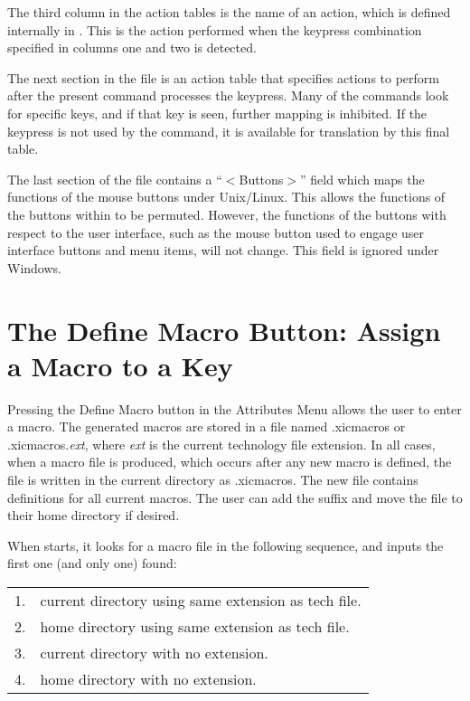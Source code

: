 The third column in the action tables is the name of an action, which
is defined internally in {\Xic}.  This is the action performed when
the keypress combination specified in columns one and two is detected.

The next section in the file is an action table that specifies actions
to perform after the present {\Xic} command processes the keypress. 
Many of the {\Xic} commands look for specific keys, and if that key is
seen, further mapping is inhibited.  If the keypress is not used by
the command, it is available for translation by this final table.

The last section of the file contains a ``{\vt $<$Buttons$>$}'' field
which maps the functions of the mouse buttons under Unix/Linux.  This
allows the functions of the buttons within {\Xic} to be permuted. 
However, the functions of the buttons with respect to the user
interface, such as the mouse button used to engage user interface
buttons and menu items, will not change.  This field is ignored under
Windows.


\section{The {\cb Define Macro} Button: Assign a Macro to a Key}
Pressing the {\cb Define Macro} button in the {\cb Attributes Menu}
allows the user to enter a macro.  The generated macros are stored in
a file named {\vt .xicmacros} or {\vt .xicmacros}.{\it ext}, where
{\it ext} is the current technology file extension.  In all cases,
when a macro file is produced, which occurs after any new macro is
defined, the file is written in the current directory as {\vt
.xicmacros}.  The new file contains definitions for all current
macros.  The user can add the suffix and move the file to their home
directory if desired.

When {\Xic} starts, it looks for a macro file in the following
sequence, and inputs the first one (and only one) found:\\
\begin{tabular}{ll}\\
1. &  current directory using same extension as tech file.\\
2. &  home directory using same extension as tech file.\\
3. &  current directory with no extension.\\
4. &  home directory with no extension.
\end{tabular}


